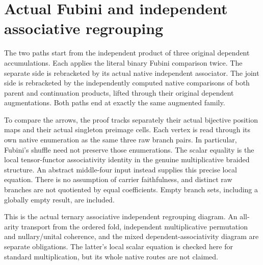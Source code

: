 \documentclass{article}
\begin{document}
\section*{Actual Fubini and independent associative regrouping}
The two paths start from the independent product of three original
dependent accumulations. Each applies the literal binary Fubini
comparison twice. The separate side is rebracketed by its actual
native independent associator. The joint side is rebracketed by
the independently computed native comparisons of both parent and
continuation products, lifted through their original dependent
augmentations. Both paths end at exactly the same augmented family.

To compare the arrows, the proof tracks separately their actual
bijective position maps and their actual singleton preimage cells.
Each vertex is read through its own native enumeration as the same
three raw branch pairs. In particular, Fubini's shuffle need not
preserve those enumerations. The scalar equality is the local
tensor-functor associativity identity in the genuine multiplicative
braided structure. An abstract middle-four input instead supplies
this precise local equation. There is no assumption of carrier
faithfulness, and distinct raw branches are not quotiented by equal
coefficients. Empty branch sets, including a globally empty result,
are included.

This is the actual ternary associative independent regrouping
diagram. An all-arity transport from the ordered fold, independent
multiplicative permutation and nullary/unital coherence, and the
mixed dependent-associativity diagram are separate obligations.
The latter's local scalar equation is checked here for standard
multiplication, but its whole native routes are not claimed.
\end{document}
